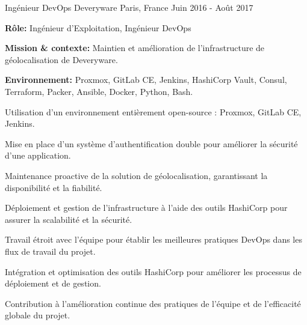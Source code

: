 \begin{cventries}
\cventry
{Ingénieur DevOps} %
{Deveryware} %
{Paris, France} %
{Juin 2016 - Août 2017} %
{
  \begin{cvitems} %
    \item {\textbf{Rôle:} Ingénieur d'Exploitation, Ingénieur DevOps}
    \item {\textbf{Mission \& contexte:} Maintien et amélioration de l'infrastructure de géolocalisation de Deveryware.}
    \item {\textbf{Environnement:} Proxmox, GitLab CE, Jenkins, HashiCorp Vault, Consul, Terraform, Packer, Ansible, Docker, Python, Bash.}
    \item {Utilisation d'un environnement entièrement open-source : Proxmox, GitLab CE, Jenkins.}
    \item {Mise en place d'un système d'authentification double pour améliorer la sécurité d'une application.}
    \item {Maintenance proactive de la solution de géolocalisation, garantissant la disponibilité et la fiabilité.}
    \item {Déploiement et gestion de l'infrastructure à l'aide des outils HashiCorp pour assurer la scalabilité et la sécurité.}
    \item {Travail étroit avec l'équipe pour établir les meilleures pratiques DevOps dans les flux de travail du projet.}
    \item {Intégration et optimisation des outils HashiCorp pour améliorer les processus de déploiement et de gestion.}
    \item {Contribution à l'amélioration continue des pratiques de l'équipe et de l'efficacité globale du projet.}
  \end{cvitems}
}


\end{cventries}
